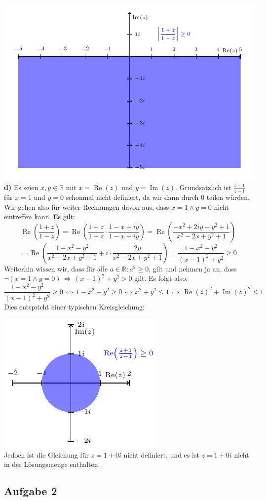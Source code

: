 \documentclass[a4paper,graphics,11pt]{article}
\newcommand{\aufgabe}[1]{\subsection*{Aufgabe #1}}
\newcommand{\re}{\operatorname{Re}}
\newcommand{\im}{\operatorname{Im}}
\begin{document}
\newpage
\qquad\qquad\qquad\includegraphics{graphics/graph5.pdf}\\
\textbf{d)}
Es seien $x,y \in \mathbb{R}$ mit $x=\re(z)$ und $y=\im(z)$.
Grundsätzlich ist $\frac{z+1}{z-1}$ für $x=1$ und $y=0$ schonmal nicht definiert, da wir
dann durch 0 teilen würden. Wir gehen also für weiter Rechnungen davon aus, dass
$x=1 \land y=0$ nicht eintreffen kann. Es gilt:
$$
    \re\left(\frac{1+z}{1-z}\right)
    = \re\left(\frac{1+z}{1-z} \cdot \frac{1-x+iy}{1-x+iy}\right)
    = \re\left(\frac{-x^2+2iy-y^2+1}{x^2-2x+y^2+1}\right)
$$$$
    = \re\left(\frac{1-x^2-y^2}{x^2-2x+y^2+1} + i\cdot \frac{2y}{x^2-2x+y^2+1}\right)
    = \frac{1-x^2-y^2}{(x-1)^2+y^2} \geq 0
$$
Weiterhin wissen wir, dass für alle $a \in \mathbb{R}\colon a^2 \geq 0$, gilt und nehmen ja
an, dass\\
$\lnot(x = 1 \land y = 0) \,\Longrightarrow\, (x-1)^2+y^2 > 0$ gilt. Es folgt also:
$$
    \frac{1-x^2-y^2}{(x-1)^2+y^2} \geq 0
    \,\Longleftrightarrow\, 1-x^2-y^2 \geq 0
    \,\Longleftrightarrow\, x^2+y^2 \leq 1
    \,\Longleftrightarrow\, \re(z)^2+\im(z)^2 \leq 1
$$
Dies entspricht einer typischen Kreisgleichung:\\
\strut\qquad\qquad\qquad\qquad\qquad\qquad\includegraphics[scale=1.5]{graphics/graph0.pdf}\\
Jedoch ist die Gleichung für $z = 1+0i$ nicht definiert, und es ist $z = 1+0i$ nicht in
der Lösungsmenge enthalten.
\newpage
\aufgabe{2}
\end{document}
